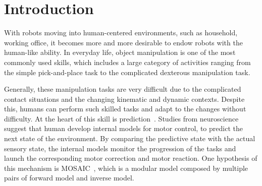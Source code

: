 \section{Introduction}
\label{intro}
With robots moving into human-centered environments, such as household, working office, it becomes more and more desirable to endow robots with the human-like ability. In everyday life, object manipulation is one of the most commonly used skills, which includes a large category of activities ranging from the simple pick-and-place task to the complicated dexterous manipulation task.


Generally, these manipulation tasks are very difficult due to the complicated contact situations and the changing kinematic and dynamic contexts. Despite this, humans can perform such skilled tasks and adapt to the changes without difficulty. At the heart of this skill is prediction~\cite{flanagan2006control}. Studies from neuroscience suggest that human develop internal models for motor control, to predict the next state of the environment. By comparing the predictive state with the actual sensory state, the internal models monitor the progression of the tasks and launch the corresponding motor correction and motor reaction. One hypothesis of this mechanism is MOSAIC~\cite{haruno2001mosaic}, which is a modular model composed by multiple pairs of forward model and inverse model. %


